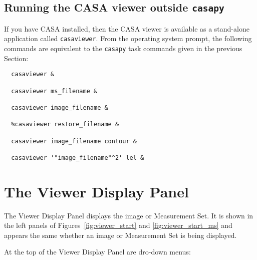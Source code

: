 \subsection{Running the CASA viewer outside {\tt casapy}}
\label{section:display.start.casaviewer}

If you have CASA installed, then the CASA viewer is available as a
stand-alone application called {\tt casaviewer}.  From the operating system prompt,
the following commands are equivalent to the {\tt casapy} task commands
given in the previous Section:

\small
\begin{verbatim}
  casaviewer &
  
  casaviewer ms_filename &
  
  casaviewer image_filename &
  
  %casaviewer restore_filename &
  
  casaviewer image_filename contour &
  
  casaviewer '"image_filename"^2' lel &
\end{verbatim}
\normalsize


\section{The Viewer Display Panel}
\label{section:display.viewerGUI.displaypanel}

 
The Viewer Display Panel displays the image or Measurement Set. It is shown in the left panels of 
Figures~\ref{fig:viewer_start} and \ref{fig:viewer_start_ms} and appears the same whether an image 
or Measurement Set is being displayed.
 
At the top of the Viewer Display Panel are dro-down menus:

